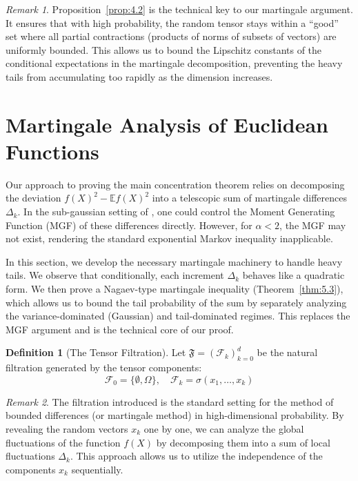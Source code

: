 \documentclass[11pt]{amsart}
\theoremstyle{definition}
\newtheorem{definition}[theorem]{Definition}
\theoremstyle{remark}
\newtheorem*{remark}{Remark}
\begin{document}
\begin{remark}
Proposition~\ref{prop:4.2} is the technical key to our martingale argument. It ensures that with high probability, the random tensor stays within a ``good'' set where all partial contractions (products of norms of subsets of vectors) are uniformly bounded. This allows us to bound the Lipschitz constants of the conditional expectations in the martingale decomposition, preventing the heavy tails from accumulating too rapidly as the dimension increases.
\end{remark}

\section{Martingale Analysis of Euclidean Functions}

Our approach to proving the main concentration theorem relies on decomposing the deviation $f(X)^2 - \mathbb{E}f(X)^2$ into a telescopic sum of martingale differences $\Delta_k$. In the sub-gaussian setting of \cite{Vershynin2020}, one could control the Moment Generating Function (MGF) of these differences directly. However, for $\alpha < 2$, the MGF may not exist, rendering the standard exponential Markov inequality inapplicable.

In this section, we develop the necessary martingale machinery to handle heavy tails. We observe that conditionally, each increment $\Delta_k$ behaves like a quadratic form. We then prove a Nagaev-type martingale inequality (Theorem~\ref{thm:5.3}), which allows us to bound the tail probability of the sum by separately analyzing the variance-dominated (Gaussian) and tail-dominated regimes. This replaces the MGF argument and is the technical core of our proof.

\begin{definition}[The Tensor Filtration]\label{def:5.1}
Let $\mathfrak{F} = (\mathcal{F}_k)_{k=0}^d$ be the natural filtration generated by the tensor components:
\begin{equation}
\mathcal{F}_0 = \{ \emptyset, \Omega \}, \quad \mathcal{F}_k = \sigma(x_1, \dots, x_k)
\end{equation}
\end{definition}

\begin{remark}
The filtration introduced is the standard setting for the method of bounded differences (or martingale method) in high-dimensional probability. By revealing the random vectors $x_k$ one by one, we can analyze the global fluctuations of the function $f(X)$ by decomposing them into a sum of local fluctuations $\Delta_k$. This approach allows us to utilize the independence of the components $x_k$ sequentially.
\end{remark}
\end{document}
